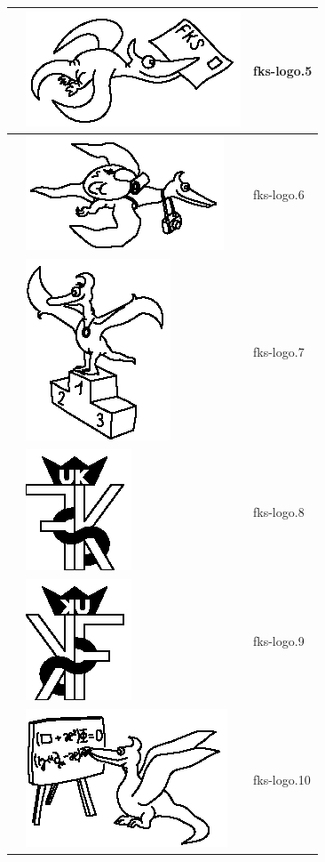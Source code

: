 \documentclass[a4paper,10pt]{article}
\begin{document}
\begin{tabularx}{\textwidth}{|l|l|X|}
    &\includegraphics{fks-logo_5}& fks-logo.5\\\hline
    &\includegraphics{fks-logo_6}& fks-logo.6\\\hline
    &\includegraphics{fks-logo_7}& fks-logo.7\\\hline
    &\includegraphics{fks-logo_8}& fks-logo.8\\\hline
    &\includegraphics{fks-logo_9}& fks-logo.9\\\hline
    &\includegraphics{fks-logo_10}& fks-logo.10\\\hline

\end{tabularx}
\end{document}
